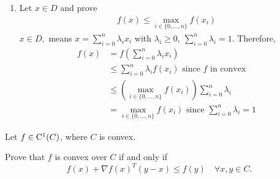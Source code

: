 \documentclass{ExerciseSheet}
\begin{document}
\begin{solution}
\begin{enumerate}
    \item Let $x\in D$ and prove 
       \begin{align*}
           f(x)\leq \max_{i\in \{0,\dots,n\}}f(x_i)
       \end{align*}
 $x\in D,$ means $\displaystyle x=\sum_{i=0}^{n}\lambda_ix_i$ with $\displaystyle \lambda_i\geq 0,~\sum_{i=0}^{n}\lambda_i=1.$ Therefore,
   \begin{align*}
       f(x)&=f\left(\sum_{i=0}^{n}\lambda_ix_i\right)  \\
           &\leq \sum_{i=0}^{n}\lambda_if(x_i)  \text{ since $f$ in convex}\\
           &\leq  \left(\max_{i\in \{0,\dots,n\}}f(x_i)\right)\sum_{i=0}^{n}\lambda_i \\
           &=\max_{i\in \{0,\dots,n\}}f(x_i)  \text{ since $\sum_{i=0}^{n}\lambda_i=1$}
   \end{align*}





       
\end{enumerate}
\end{solution}

\fi

\vskip 0.5cm

\begin{problem}\label{thm:gradient_ineq}
	Let $f\in \mathord{\mathrm{C^1}}(C)$, where $C$ is convex. 
 
 Prove that $f$ is convex over $C$ if and only if
	\begin{equation}\label{eq:grad_ineq}
		f(x) +\nabla f(x)^T(y-x)\leq f(y) \quad \forall x, y\in C.
	\end{equation}
\end{problem}
\end{document}
